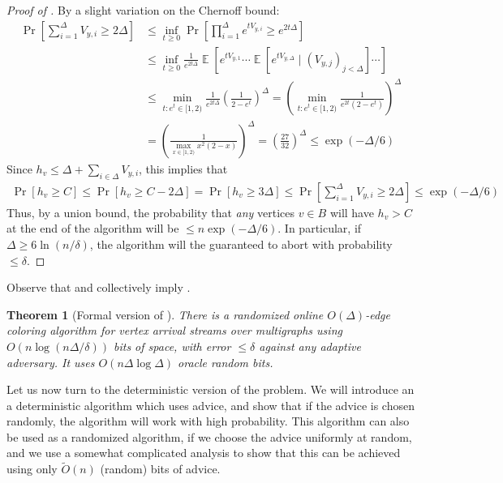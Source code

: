 \documentclass[10pt]{article}
\newtheorem{theorem}{Theorem}[section]
\theoremstyle{definition}\newtheorem{definition}[lemma]{Definition}
\theoremstyle{remark}  \newtheorem*{remark}{Remark}
\DeclareMathOperator{\EE}{\mathbb{E}}
\newcommand{\tO}{\widetilde{O}}
\begin{document}
\begin{proof}[Proof of ]
  By a slight variation on the Chernoff bound:
  \begin{align*}
    \Pr[\sum_{i=1}^{\Delta} V_{y,i} \ge 2 \Delta] &\le \inf_{t\ge 0} \Pr\left[\prod_{i=1}^{\Delta} e^{t V_{y,i}} \ge e^{2 t \Delta}\right] \\
     &\le \inf_{t\ge 0} \frac{1}{e^{2 t \Delta}} \EE[e^{t V_{y,1}} \cdots \EE\left[e^{t V_{y,\Delta}} \mid (V_{y,j})_{j<\Delta}\right] \cdots ]  \\
     &\le \min_{t : e^t \in [1,2)} \frac{1}{e^{2 t \Delta}} \left(\frac{1}{2 - e^t}\right)^\Delta = \left( \min_{t : e^t \in [1,2)} \frac{1}{e^{2t} (2-e^t)}\right)^\Delta \\
     &= \left( \frac{1}{\max_{x \in [1,2)} x^2 (2-x)}\right)^\Delta = \left(\frac{27}{32}\right)^\Delta \le \exp(-\Delta/6)
  \end{align*}
  Since $h_v \le \Delta + \sum_{i\in\Delta} V_{y,i}$, this implies that
  \begin{align*}
    \Pr[h_v \ge C] \le \Pr[h_v \ge C - 2 \Delta] = \Pr[h_v \ge 3 \Delta] \le \Pr[\sum_{i=1}^{\Delta} V_{y,i} \ge 2 \Delta] \le  \exp(-\Delta/6)
  \end{align*}
  Thus, by a union bound, the probability that \emph{any} vertices $v \in B$ will have $h_v > C$ at the end of the algorithm will be $\le n \exp(-\Delta/6)$. In particular, if $\Delta \ge 6 \ln(n / \delta)$, the algorithm will the guaranteed to abort with probability $\le \delta$.
\end{proof}

Observe that  and  collectively imply .

\begin{theorem}[Formal version of ]\label{thm:online-rand-va-formal}
   There is a randomized online $O(\Delta)$-edge coloring algorithm for vertex arrival streams over multigraphs using $O(n \log (n \Delta / \delta))$ bits of space, with error $\le \delta$ against any adaptive adversary. It uses $O(n \Delta \log \Delta)$ oracle random bits.
\end{theorem}

Let us now turn to the deterministic version of the problem. We will introduce an a deterministic algorithm which uses advice, and show that if the advice is chosen randomly, the algorithm will work with high probability. This algorithm can also be used as a randomized algorithm, if we choose the advice uniformly at random, and we use a somewhat complicated analysis to show that this can be achieved using only $\tO(n)$ (random) bits of advice.
\end{document}
